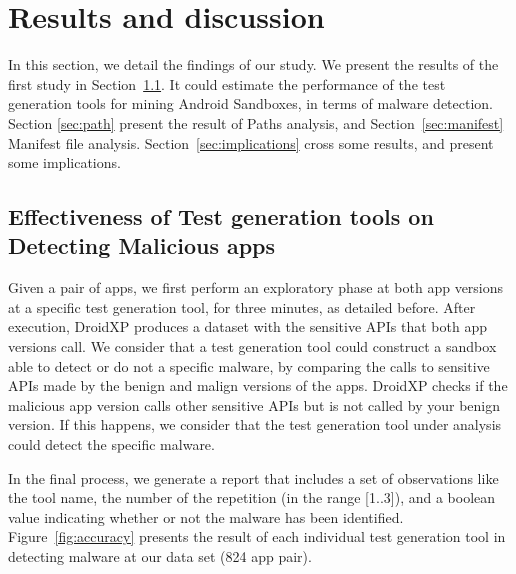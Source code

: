 \section{Results and discussion}\label{sec:results}

In this section, we detail the findings of our study. We present the results of the first study in Section~\ref{sec:testGeneration}. It could estimate the performance of the test generation tools for mining Android  Sandboxes, in terms of malware detection. Section \ref{sec:path} present the result of Paths analysis, and Section~\ref{sec:manifest} Manifest file analysis. Section~\ref{sec:implications} cross some results, and present some implications.

\subsection{Effectiveness of Test generation tools on Detecting Malicious apps}\label{sec:testGeneration}

Given a pair of apps, we first perform an exploratory phase at both app versions at a specific test generation tool, for three minutes, as detailed before. After execution, DroidXP produces a dataset with the sensitive APIs that both app versions call. We consider that a test generation tool could construct a sandbox able to detect or do not a specific malware, by comparing the calls to sensitive APIs made by the benign and malign versions of the apps. DroidXP checks if the malicious app version calls other sensitive APIs but is not called by your benign version. If this happens, we consider that the test generation tool under analysis could detect the specific malware.

In the final process, we generate a report that includes a set of observations like the tool name, the number of the repetition (in the range [1..3]), and a boolean value indicating whether or not the malware has been identified. Figure~\ref{fig:accuracy} presents the result of each individual test generation tool in detecting malware at our data set (824 app pair).

